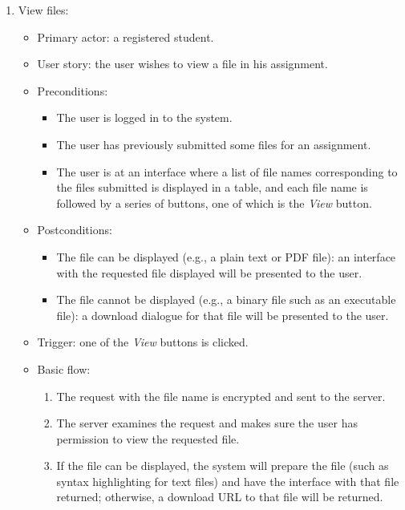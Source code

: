 \begin{enumerate}
\item View files:
\begin{itemize}
    \item Primary actor: a registered student.
    \item User story: the user wishes to view a file in his assignment.
    \item Preconditions:
        \begin{itemize}
            \item The user is logged in to the system.
            \item The user has previously submitted some files for an
                assignment.
            \item The user is at an interface where a list of file names
                corresponding to the files submitted is displayed in a table,
                and each file name is followed by a series of buttons,
                one of which is the \emph{View} button.
        \end{itemize}
    \item Postconditions:
        \begin{itemize}
            \item The file can be displayed (e.g., a plain text or PDF file): 
                an interface with the requested file
                displayed will be presented to the user.
            \item The file cannot be displayed (e.g., a binary file such as an executable
                file): a download dialogue for that file will be presented to
                the user.
        \end{itemize}
    \item Trigger: one of the \emph{View} buttons is clicked.
    \item Basic flow:
        \begin{enumerate}
            \item The request with the file name is encrypted and sent to the server.
            \item The server examines the request and makes sure the user
                has permission to view the requested file.
            \item If the file can be displayed, the system will prepare the
                file (such as syntax highlighting for text files) and
                have the interface with that file returned; otherwise, a download
                URL to that file will be returned.
        \end{enumerate}
\end{itemize}
\end{enumerate}


